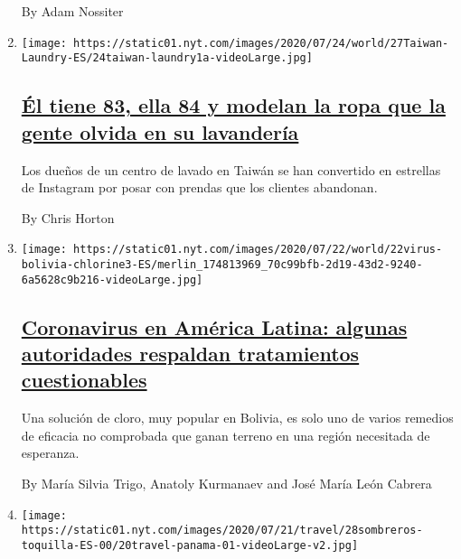 \begin{enumerate}
  By Adam Nossiter
\item
  \texttt{[image: https://static01.nyt.com/images/2020/07/24/world/27Taiwan-Laundry-ES/24taiwan-laundry1a-videoLarge.jpg]}

  \hypertarget{uxe9l-tiene-83-ella-84-y-modelan-la-ropa-que-la-gente-olvida-en-su-lavanderuxeda}{%
  \subsection{\texorpdfstring{\href{/es/2020/07/28/espanol/mundo/lavanderia-taiwanesa-instagram.html}{Él
  tiene 83, ella 84 y modelan la ropa que la gente olvida en su
  lavandería}}{Él tiene 83, ella 84 y modelan la ropa que la gente olvida en su lavandería}}\label{uxe9l-tiene-83-ella-84-y-modelan-la-ropa-que-la-gente-olvida-en-su-lavanderuxeda}}

  Los dueños de un centro de lavado en Taiwán se han convertido en
  estrellas de Instagram por posar con prendas que los clientes
  abandonan.

  By Chris Horton
\item
  \texttt{[image: https://static01.nyt.com/images/2020/07/22/world/22virus-bolivia-chlorine3-ES/merlin\_174813969\_70c99bfb-2d19-43d2-9240-6a5628c9b216-videoLarge.jpg]}

  \hypertarget{coronavirus-en-amuxe9rica-latina-algunas-autoridades-respaldan-tratamientos-cuestionables}{%
  \subsection{\texorpdfstring{\href{/es/2020/07/23/espanol/america-latina/bolivia-cloro-coronavirus-ivermectina.html}{Coronavirus
  en América Latina: algunas autoridades respaldan tratamientos
  cuestionables}}{Coronavirus en América Latina: algunas autoridades respaldan tratamientos cuestionables}}\label{coronavirus-en-amuxe9rica-latina-algunas-autoridades-respaldan-tratamientos-cuestionables}}

  Una solución de cloro, muy popular en Bolivia, es solo uno de varios
  remedios de eficacia no comprobada que ganan terreno en una región
  necesitada de esperanza.

  By María Silvia Trigo, Anatoly Kurmanaev and José María León Cabrera
\item
  \texttt{[image: https://static01.nyt.com/images/2020/07/21/travel/28sombreros-toquilla-ES-00/20travel-panama-01-videoLarge-v2.jpg]}

  \hypertarget{una-visita-a-los-talleres-de-los-mejores-fabricantes-de-sombreros-en-ecuador}{%
}
\end{enumerate}
